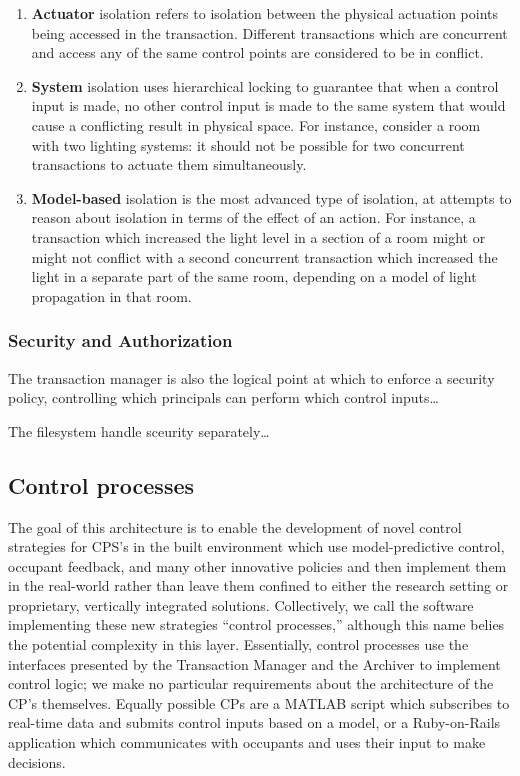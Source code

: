 \begin{enumerate}
\item {\bf Actuator} isolation refers to isolation between the physical actuation points being accessed in the transaction.  Different transactions which are concurrent and access any of the same control points are considered to be in conflict.
\item {\bf System} isolation uses hierarchical locking to guarantee that when a control input is made, no other control input is made to the same system that would cause a conflicting result in physical space.  For instance, consider a room with two lighting systems: it should not be possible for two concurrent transactions to actuate them simultaneously.
\item {\bf Model-based} isolation is the most advanced type of isolation, at attempts to reason about isolation in terms of the effect of an action.  For instance, a transaction which increased the light level in a section of a room might or might not conflict with a second concurrent transaction which increased the light in a separate part of the same room, depending on a model of light propagation in that room.
\end{enumerate}

\subsubsection{Security and Authorization}

The transaction manager is also the logical point at which to enforce a security policy, controlling which principals can perform which control inputs\dots

The filesystem handle sceurity separately\dots


\subsection{Control processes}

The goal of this architecture is to enable the development of novel control strategies for CPS's in the built environment which use model-predictive control, occupant feedback, and many other innovative policies and then implement them in the real-world rather than leave them confined to either the research setting or proprietary, vertically integrated solutions.  Collectively, we call the software implementing these new strategies ``control processes,'' although this name belies the potential complexity in this layer.  Essentially, control processes use the interfaces presented by the Transaction Manager and the Archiver to implement control logic; we make no particular requirements about the architecture of the CP's themselves.  Equally possible CPs are a MATLAB script which subscribes to real-time data and submits control inputs based on a model, or a Ruby-on-Rails application which communicates with occupants and uses their input to make decisions.

